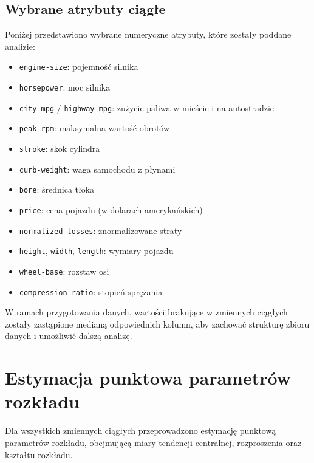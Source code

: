 \documentclass[12pt,a4paper]{article}
\begin{document}
\subsection{Wybrane atrybuty ciągłe}
Poniżej przedstawiono wybrane numeryczne atrybuty, które zostały poddane analizie:
\begin{itemize}
    \item \texttt{engine-size}: pojemność silnika
    \item \texttt{horsepower}: moc silnika
    \item \texttt{city-mpg} / \texttt{highway-mpg}: zużycie paliwa w mieście i na autostradzie
    \item \texttt{peak-rpm}: maksymalna wartość obrotów
    \item \texttt{stroke}: skok cylindra
    \item \texttt{curb-weight}: waga samochodu z płynami
    \item \texttt{bore}: średnica tłoka
    \item \texttt{price}: cena pojazdu (w dolarach amerykańskich)
    \item \texttt{normalized-losses}: znormalizowane straty
    \item \texttt{height}, \texttt{width}, \texttt{length}: wymiary pojazdu
    \item \texttt{wheel-base}: rozstaw osi
    \item \texttt{compression-ratio}: stopień sprężania
\end{itemize}

W ramach przygotowania danych, wartości brakujące w zmiennych ciągłych zostały zastąpione medianą odpowiednich kolumn, aby zachować strukturę zbioru danych i umożliwić dalszą analizę.

\section{Estymacja punktowa parametrów rozkładu}

Dla wszystkich zmiennych ciągłych przeprowadzono estymację punktową parametrów rozkładu, obejmującą miary tendencji centralnej, rozproszenia oraz kształtu rozkładu.
\end{document}
